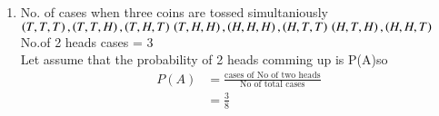 \renewcommand{\theequation}{\theenumi}
\begin{enumerate}[label=\arabic*.,ref=\thesubsection.\theenumi]
\item No. of cases when three coins are tossed simultaniously
\\
$\left(T,T,T\right),\left(T,T,H\right),\left(T,H,T\right)
\\
\left(T,H,H\right),\left(H,H,H\right),\left(H,T,T\right)
\\
\left(H,T,H\right),\left(H,H,T\right)$
\\
No.of 2 heads cases = 3
\\
Let assume that the probability of 2 heads comming up is P(A)so
\begin{align}
P\left(A\right) &= \frac{\text {cases of No of two heads}}{\text {No of total cases}}
\\
&= \frac{3}{8}
\end{align}
\end{enumerate}